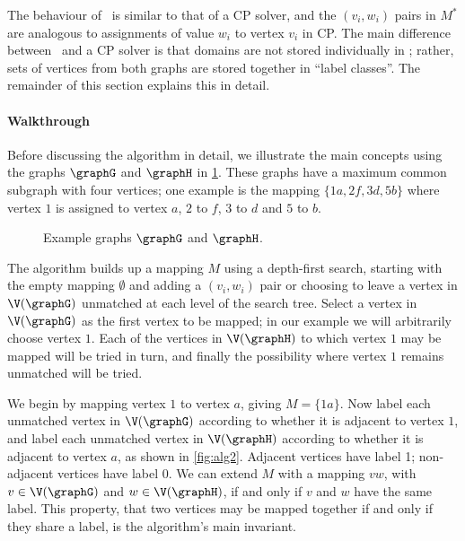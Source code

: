 The behaviour of \McSplit\ is similar to that of a CP solver, and the
$(v_i, w_i)$
pairs in $M^*$ are analogous to assignments of value $w_i$ to vertex $v_i$ in CP.
The main difference between \McSplit\ and a CP solver is that domains are not
stored individually in \McSplit; rather, sets of vertices from both graphs
are stored together in ``label classes''.  The remainder of this section explains
this in detail.

\paragraph{Walkthrough} Before discussing the algorithm in detail, we illustrate
the main concepts using the graphs $\graphG$ and $\graphH$ in
\cref{fig:alg1}.  These graphs have a maximum common subgraph with four
vertices; one example is the mapping $\{1a, 2f, 3d, 5b\}$ where vertex $1$ is
assigned to vertex $a$, $2$ to $f$, $3$ to $d$ and $5$ to $b$.

\begin{figure}[htb]
\centering
    \exampleG
    \qquad
    \exampleH
\caption{Example graphs $\graphG$ and $\graphH$.}
\label{fig:alg1}
\end{figure}

The algorithm builds up a mapping $M$ using a depth-first search, starting with the empty mapping
$\emptyset$ and adding a $(v_i, w_i)$ pair or choosing to leave a vertex in $\V(\graphG)$ unmatched at each level of the search tree.
Select a vertex in $\V(\graphG)$ as the first vertex to be mapped; in our
example we will arbitrarily choose vertex $1$. Each of the vertices in
$\V(\graphH)$ to which vertex $1$ may be mapped will be tried in turn, and
finally the possibility where vertex $1$ remains unmatched will be tried.

We begin by mapping vertex $1$ to vertex $a$, giving $M=\{1a\}$.  Now
label each unmatched vertex in $\V(\graphG)$ according to whether it is adjacent to vertex $1$, and
label each unmatched vertex in $\V(\graphH)$ according to whether it is adjacent to vertex $a$,
as shown in \cref{fig:alg2}.  Adjacent
vertices have label 1; non-adjacent vertices have label 0.  We can extend $M$
with a mapping $vw$, with $v \in \V(\graphG)$ and $w \in \V(\graphH)$, if and only
if $v$ and $w$ have the same label.  This property, that two vertices may be
mapped together if and only if they share a label, is the algorithm's main
invariant.

